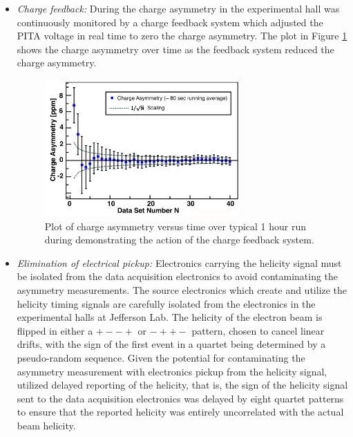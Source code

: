 \begin{itemize}
A series of Pockels cell position and angle scans were completed to find the optimal placement that minimizes HC deflections. Position differences on the laser are measured using a photodiode array and zeroed at the few micron level. With an ideal optical setup in the accelerator and injector, an effect called ``adiabatic damping'' reduces the beam emittance (a measure of the width of position and angle distributions in the electron beam) by a factor of $\sqrt{p_0/p}$ between the injector and the hall \cite{Paschke2007}. For the \Qs experiment with a 1.16~GeV beam and a 100~keV injector ($p_0 = 335$~keV) the position differences could be reduced in the hall by as much as a factor of 54 relative to the sourc
\item{\it Charge feedback:} During \Qs the charge asymmetry in the experimental hall was continuously monitored by a charge feedback system which adjusted the PITA voltage in real time to zero the charge asymmetry. The plot in Figure \ref{fig:charge_feedback} shows the charge asymmetry over time as the feedback system reduced the charge asymmetry.
\begin{figure}[ht]
\centering
\includegraphics[width=0.7\textwidth]{Pictures/charge_feedback.pdf}
\caption{\label{fig:charge_feedback}Plot of charge asymmetry versus time over typical 1 hour run during \Qs demonstrating the action of the charge feedback system.}
\end{figure}

\item {\it Elimination of electrical pickup:} Electronics carrying the helicity signal must be isolated from the data acquisition electronics to avoid contaminating the asymmetry measurements. The source electronics which create and utilize the helicity timing signals are carefully isolated from the electronics in the experimental halls at Jefferson Lab. The helicity of the electron beam is flipped in either a $+--+$ or $-++-$ pattern, chosen to cancel linear drifts, with the sign of the first event in a quartet being determined by a pseudo-random sequence. Given the potential for contaminating the asymmetry measurement with electronics pickup from the helicity signal, \Qs utilized delayed reporting of the helicity, that is, the sign of the helicity signal sent to the data acquisition electronics was delayed by eight quartet patterns to ensure that the reported helicity was entirely uncorrelated with the actual beam helicity.


\end{itemize}
